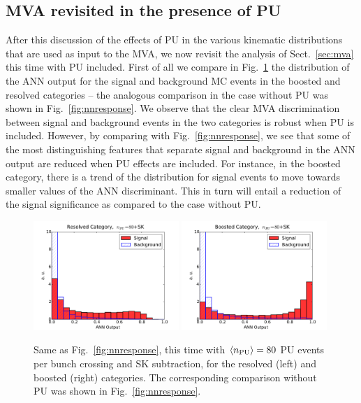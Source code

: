 \subsection{MVA revisited in the presence of PU}

After this discussion of the effects 
of PU in the various kinematic distributions
that are used
as input to the MVA, we now revisit the analysis
of Sect.~\ref{sec:mva} this time with PU included.
%
First of all we compare in Fig.~\ref{fig:nnresponse_PU}
the distribution of the ANN output for the
signal and background MC events in the boosted and resolved categories --
the analogous comparison in the case without PU was shown
in Fig.~\ref{fig:nnresponse}.
%
We observe that the clear MVA discrimination
between signal and background events in the two categories is robust
when PU is included.
%
However, by comparing with Fig.~\ref{fig:nnresponse}, we see
that some of the most distinguishing features that separate signal
and background in the ANN output are reduced when PU effects
are included.
%
For instance, in the boosted category, there is a trend of the distribution
for signal events to move towards smaller values of the
ANN discriminant.
%
This in turn will entail a reduction of the signal significance as
compared to the case without PU.

\begin{figure}[t]
  \begin{center}
\includegraphics[width=0.49\textwidth]{plots/Resolved_disc_SKPU80.pdf}
\includegraphics[width=0.49\textwidth]{plots/Boosted_disc_SKPU80.pdf}
\caption{\small Same as Fig.~\ref{fig:nnresponse},
  this time with $\left\langle n_{\rm PU}\right\rangle=80$ PU events per bunch crossing
  and SK subtraction, for the resolved (left) and boosted
  (right) categories.
  The corresponding comparison without PU was shown in
  Fig.~\ref{fig:nnresponse}.
}
\label{fig:nnresponse_PU}
\end{center}
\end{figure}


